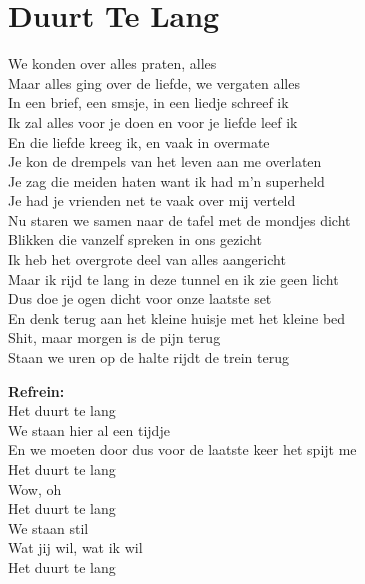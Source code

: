 \section{Duurt Te Lang}
We konden over alles praten, alles\\
Maar alles ging over de liefde, we vergaten alles\\
In een brief, een smsje, in een liedje schreef ik\\
Ik zal alles voor je doen en voor je liefde leef ik\\
En die liefde kreeg ik, en vaak in overmate\\
Je kon de drempels van het leven aan me overlaten\\
Je zag die meiden haten want ik had m’n superheld\\
Je had je vrienden net te vaak over mij verteld\\
Nu staren we samen naar de tafel met de mondjes dicht\\
Blikken die vanzelf spreken in ons gezicht\\
Ik heb het overgrote deel van alles aangericht\\
Maar ik rijd te lang in deze tunnel en ik zie geen licht\\
Dus doe je ogen dicht voor onze laatste set\\
En denk terug aan het kleine huisje met het kleine bed\\
Shit, maar morgen is de pijn terug\\
Staan we uren op de halte rijdt de trein terug

\textbf{Refrein:}\\
Het duurt te lang\\
We staan hier al een tijdje\\
En we moeten door dus voor de laatste keer het spijt me\\
Het duurt te lang\\
Wow, oh\\
Het duurt te lang\\
We staan stil\\
Wat jij wil, wat ik wil\\
Het duurt te lang

